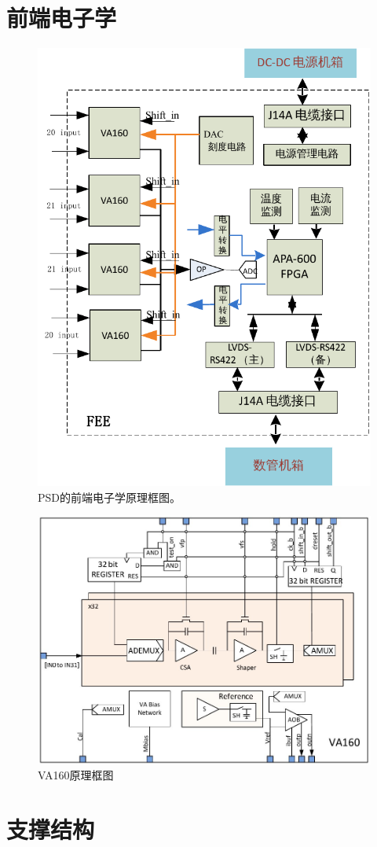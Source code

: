 \section{前端电子学}
\label{sec:psd_electronics}
\begin{figure}[t]
\centering
\includegraphics[width=0.8\linewidth]{chap/description/fig/psd_fee1}
\caption{PSD的前端电子学原理框图。}
\label{fig:ch2:psd_fee1}
\end{figure}

\begin{figure}
\centering
\includegraphics[width=0.8\linewidth]{chap/description/fig/va160}
\caption{VA160原理框图}
\label{fig:ch2:va160}
\end{figure}

\section{支撑结构}
\label{sec:psd_support}